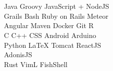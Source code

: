 \documentclass[]{deedy-resume-openfont}
\begin{document}
\begin{minipage}[t]{0.33\textwidth}


\section{\education}

\subsection{\educationMSName}
\descript{\educationMSLocation}
\location{\educationMSDuration}
\educationMSArea
\sectionsep

\subsection{\educationBSName}
\descript{\educationBSLocation}
\location{\educationBSDuration}


\section{\skills}
\subsection{\software}
\location{\softwareProfessional:}
Java \textbullet{} Groovy \textbullet{} JavaScript + NodeJS \textbullet{} \\
Grails \textbullet{} Bash \textbullet{} Ruby on Rails \textbullet{} Meteor \textbullet{} \\
Angular \textbullet{} Maven \textbullet{} Docker \textbullet{} Git \textbullet{} R \\
\location{\softwareProjects:}
C \textbullet{} C++ \textbullet{} CSS \textbullet{} Android \textbullet{} Arduino \\
Python \textbullet{} \LaTeX \textbullet{} Tomcat \textbullet{} ReactJS \textbullet{} \\
AdonisJS \\
\location{\softwareHobby:}
Rust \textbullet{} VimL \textbullet{} FishShell
\sectionsep

\subsection{\languages}
\location{\languagesEN}
\location{\languagesFR}
\location{\languagesJP}
\ifdefined\languagesPT
  \location{\languagesPT}
\fi


\end{minipage}
\end{document}
